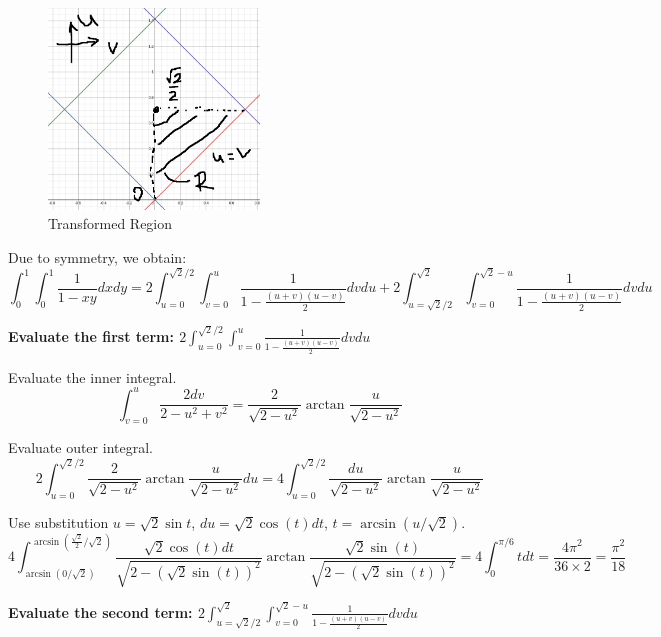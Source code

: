 \documentclass{article}
\begin{document}
\begin{figure}[H]
  \centering
  \includegraphics[width=0.5\textwidth]{calculus/W4/img/rh}
  \caption{Transformed Region}
\end{figure}

Due to symmetry, we obtain:
\begin{equation*}
  \int_0^1 \int_0^1 \frac{1}{1-xy} dxdy = 2 \int_{u=0}^{\sqrt{2}/2} \int_{v=0}^{u} \frac{1}{1 - \frac{(u+v)(u-v)}{2}} dvdu + 2\int_{u=\sqrt{2}/2}^{\sqrt{2}} \int_{v=0}^{\sqrt{2}-u} \frac{1}{1 - \frac{(u+v)(u-v)}{2}} dvdu
\end{equation*}

\textbf{Evaluate the first term: $2 \int_{u=0}^{\sqrt{2}/2} \int_{v=0}^{u} \frac{1}{1 - \frac{(u+v)(u-v)}{2}} dvdu$}

Evaluate the inner integral.
\begin{equation*}
  \int_{v=0}^u \frac{2dv}{2-u^2+v^2} = \frac{2}{\sqrt{2-u^2}} \arctan \frac{u}{\sqrt{2-u^2}}
\end{equation*}

Evaluate outer integral.
\begin{equation*}
  2 \int_{u=0}^{\sqrt{2}/2} \frac{2}{\sqrt{2-u^2}} \arctan \frac{u}{\sqrt{2-u^2}} du = 4 \int_{u=0}^{\sqrt{2}/2} \frac{du}{\sqrt{2-u^2}} \arctan \frac{u}{\sqrt{2-u^2}} 
\end{equation*}

Use substitution $u=\sqrt{2}\sin{t}$, $du = \sqrt{2} \cos(t) dt$, $t = \arcsin(u/\sqrt{2})$.
\begin{equation*}
  4 \int_{\arcsin(0/\sqrt{2})}^{\arcsin(\frac{\sqrt{2}}{2}/\sqrt{2})} \frac{\sqrt{2}\cos(t) dt}{\sqrt{2-(\sqrt{2} \sin(t))^2}} \arctan \frac{\sqrt{2} \sin(t)}{\sqrt{2-(\sqrt{2} \sin(t))^2}} = 4 \int_{0}^{\pi/6} t dt = \frac{4 \pi^2}{36 \times 2} = \frac{\pi^2}{18} 
\end{equation*}


\textbf{Evaluate the second term: $2\int_{u=\sqrt{2}/2}^{\sqrt{2}} \int_{v=0}^{\sqrt{2}-u} \frac{1}{1 - \frac{(u+v)(u-v)}{2}} dvdu$}
\end{document}
